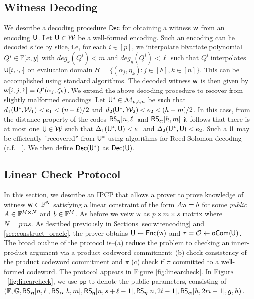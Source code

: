 \subsection{Witness Decoding}\label{sec:witdecoding}
We describe a decoding procedure $\mathsf{Dec}$ for obtaining a witness $\mathsf{w}$ from an encoding
$\mathsf{U}$. Let $\mathsf{U}\in \mathcal{W}$ be a well-formed encoding. Such an encoding can
be decoded slice by slice, i.e, for each $i\in [p]$, we interpolate bivariate
polynomial $Q^i\in \mathbb{F}[x,y]$ with $deg_x(Q^i)<m$ and $deg_y(Q^i)<\ell$ such that
$Q^i$ interpolates $\mathsf{U}[i,\cdot,\cdot]$ on evaluation domain $H=\{(\alpha_j,\eta_k): j\in [h],
k\in [n]\}$. This can be accomplished using
standard algorithms. The decoded witness $\mathsf{w}$ is then given by
$\mathsf{w}[i,j,k]=Q^i(\alpha_j,\zeta_k)$. We extend the above decoding procedure to
recover from slightly malformed encodings. Let $\mathsf{U}^*\in \mathcal{M}_{p,h,n}$ be such
that $d_1(\mathsf{U}^*,\mathcal{W}_1)<e_1 <(n-\ell)/2 $ and $d_2(\mathsf{U}^*,\mathcal{W}_2)<e_2
<(h-m)/2$. In this case, from the distance property of the codes $\mathsf{RS}_{\bm{\eta}}[n,\ell]$
and $\mathsf{RS}_{\bm{\alpha}}[h,m]$ it follows that there is at most one $\mathsf{U}\in \mathcal{W}$ such that
$\Delta_1(\mathsf{U}^*,\mathsf{U})<e_1$ and $\Delta_2(\mathsf{U}^*,\mathsf{U})<e_2$. Such a $\mathsf{U}$
may be efficiently ``recovered'' from $\mathsf{U}^*$ using algorithms for Reed-Solomon decoding
(c.f. ~\cite{CodingTheory}). We then define $\mathsf{Dec}(\mathsf{U}^*)$ as $\mathsf{Dec}(\mathsf{U})$.

\subsection{Linear Check Protocol}\label{sec:lincheck}
In this section, we describe an IPCP that allows a prover to prove knowledge of
witness $\mathsf{w}\in \mathbb{F}^N$ satisfying a linear constraint of the form $A\mathsf{w} = b$
for some {\em public} $A\in \mathbb{F}^{M\times N}$ and $b\in \mathbb{F}^M$. As before we veiw $\mathsf{w}$ as
$p\times m\times s$ matrix where $N=pms$. As desribed previously in Sections
\ref{sec:witencoding} and \ref{sec:construct_oracle}, the prover obtains $\mathsf{U}\gets 
\mathsf{Enc}(\mathsf{w})$ and $\pi=\mathcal{O} \gets \mathsf{oCom}(\mathsf{U})$. %
The broad  outline of the protocol is--(a) reduce the problem to checking an inner-product argument via a product codeword commitment; (b) check consistency of the product codeword commitment and $\pi$ (c) check if $\pi$ committed to a well-formed codeword. The protocol appears in 
Figure \ref{fig:linearcheck}. In Figure ~\ref{fig:linearcheck}, we use
$\mathsf{pp}$ to denote the public parameters, consisting of $(\mathbb{F}, \mathbb{G}, \mathsf{RS}_{\bm{\eta}}[n,\ell],
\mathsf{RS}_{\bm{\alpha}}[h,m],\mathsf{RS}_{\bm{\eta}}[n,s+\ell-1],\mathsf{RS}_{\bm{\eta}}[n,2\ell-1],
\mathsf{RS}_{\bm{\alpha}}[h,2m-1], \bm{g},h)$.

